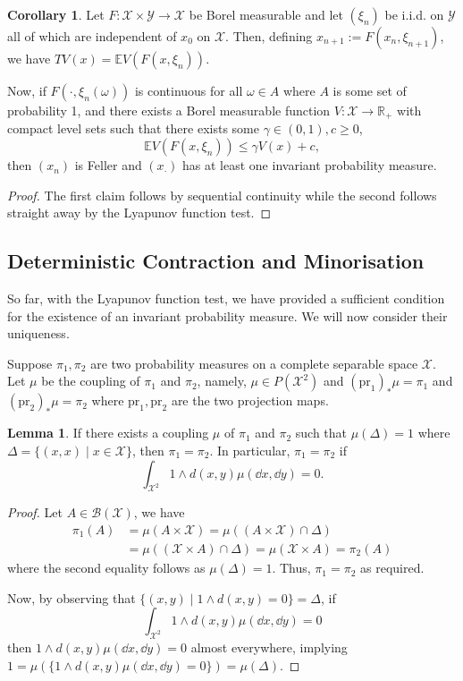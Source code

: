 \documentclass[]{article}
\theoremstyle{definition}
\newtheorem{corollary}{Corollary}[theorem]
\theoremstyle{definition}
\newtheorem{lemma}{Lemma}[section]
\begin{document}
\begin{corollary}
  Let \(F : \mathcal{X} \times \mathcal{Y} \to \mathcal{X}\) be Borel measurable and 
  let \((\xi_n)\) be i.i.d. on \(\mathcal{Y}\) all of which are independent of 
  \(x_0\) on \(\mathcal{X}\). Then, defining \(x_{n + 1} := F(x_n, \xi_{n + 1})\),
  we have \(TV(x) = \mathbb{E}V(F(x, \xi_n))\). 
  
  Now, if \(F(\cdot, \xi_n(\omega))\) 
  is continuous for all \(\omega \in A\) where \(A\) is some set of probability 1, 
  and there exists a Borel measurable function \(V : \mathcal{X} \to \mathbb{R}_+\) 
  with compact level sets such that there exists some \(\gamma \in (0, 1), c \ge 0\), 
  \[\mathbb{E}V(F(x, \xi_n)) \le \gamma V(x) + c,\]
  then \((x_n)\) is Feller and \((x_\cdot)\) has at least one invariant probability
  measure.
\end{corollary}
\begin{proof}
  The first claim follows by sequential continuity while the second follows straight 
  away by the Lyapunov function test.
\end{proof}

\subsection{Deterministic Contraction and Minorisation}

So far, with the Lyapunov function test, we have provided a sufficient condition
for the existence of an invariant probability measure. We will now consider their 
uniqueness. 

Suppose \(\pi_1, \pi_2\) are two probability measures on a complete separable 
space \(\mathcal{X}\). Let \(\mu\) be the coupling of \(\pi_1\) and \(\pi_2\), 
namely, \(\mu \in P(\mathcal{X}^2)\) and \((\text{pr}_1)_*\mu = \pi_1\) and 
\((\text{pr}_2)_*\mu = \pi_2\) where \(\text{pr}_1, \text{pr}_2\) are the two 
projection maps.

\begin{lemma}
  If there exists a coupling \(\mu\) of \(\pi_1\) and \(\pi_2\) such that 
  \(\mu(\Delta) = 1\) where \(\Delta = \{(x, x) \mid x \in \mathcal{X}\}\), 
  then \(\pi_1 = \pi_2\). In particular, \(\pi_1 = \pi_2\) if 
  \[\int_{\mathcal{X}^2} 1 \wedge d(x, y) \mu(\dd x, \dd y) = 0.\]
\end{lemma}
\begin{proof}
  Let \(A \in \mathcal{B}(\mathcal{X})\), we have 
  \[\begin{split}
    \pi_1(A) & = \mu(A \times \mathcal{X}) = \mu((A \times \mathcal{X}) \cap \Delta)\\
    & = \mu((\mathcal{X} \times A) \cap \Delta) = \mu(\mathcal{X} \times A) = \pi_2(A)
  \end{split}\]
  where the second equality follows as \(\mu(\Delta) = 1\). Thus, \(\pi_1 = \pi_2\) 
  as required.

  Now, by observing that \(\{(x, y) \mid 1 \wedge d(x, y) = 0\} = \Delta\), if 
  \[\int_{\mathcal{X}^2} 1 \wedge d(x, y) \mu(\dd x, \dd y) = 0\]
  then \(1 \wedge d(x, y) \mu(\dd x, \dd y) = 0\) almost everywhere, implying 
  \(1 = \mu(\{1 \wedge d(x, y) \mu(\dd x, \dd y) = 0\}) = \mu(\Delta)\).
\end{proof}
\end{document}

